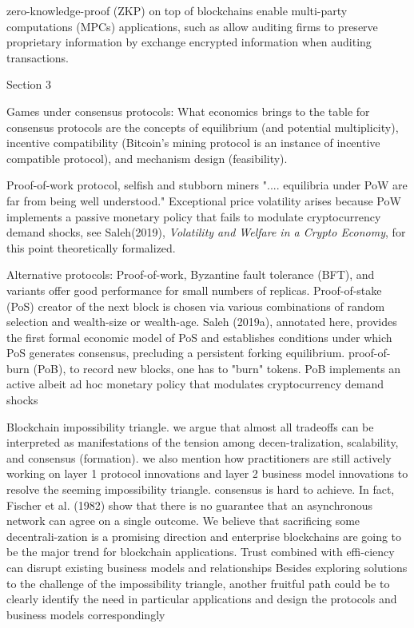         zero-knowledge-proof (ZKP) on top of blockchains enable multi-party computations (MPCs) applications, such as allow auditing firms to preserve proprietary information by exchange encrypted information when auditing transactions.

Section 3

        Games under consensus protocols: What economics brings to the table for consensus protocols are the concepts of equilibrium (and potential multiplicity), incentive compatibility (Bitcoin's mining protocol is an instance of incentive compatible protocol), and mechanism design (feasibility).

        Proof-of-work protocol, selfish and stubborn miners ".... equilibria under PoW are far from being well understood." Exceptional price volatility arises because PoW implements a passive monetary policy that fails to modulate cryptocurrency demand shocks, see Saleh(2019), \textit{Volatility and Welfare in a Crypto Economy}, for this point theoretically formalized.

        Alternative protocols: Proof-of-work, Byzantine fault tolerance (BFT), and variants offer good performance for small numbers of replicas. Proof-of-stake (PoS) creator of the next block is chosen via various combinations of random selection and wealth-size or wealth-age. Saleh (2019a), annotated here, provides the first formal economic model of PoS and establishes conditions under which PoS generates consensus, precluding a persistent forking equilibrium. proof-of-burn (PoB), to record new blocks, one has to "burn" tokens. PoB implements an active albeit ad hoc monetary policy that modulates cryptocurrency demand shocks

        Blockchain impossibility triangle. we argue that almost all tradeoffs can be interpreted as manifestations of the tension among decen-tralization, scalability, and consensus (formation). we also mention how practitioners are still actively working on layer 1 protocol innovations and layer 2 business model innovations to resolve the seeming impossibility triangle.  consensus is hard to achieve. In fact, Fischer et al. (1982) show that there is no guarantee that an asynchronous network can agree on a single outcome. We believe that sacrificing some decentrali-zation is a promising direction and enterprise blockchains are going to be the major trend for blockchain applications. Trust combined with effi-ciency can disrupt existing business models and relationships Besides exploring solutions to the challenge of the impossibility triangle, another fruitful path could be to clearly identify the need in particular applications and design the protocols and business models correspondingly
        
